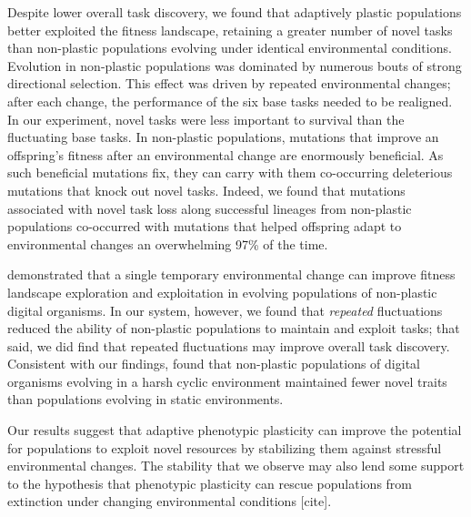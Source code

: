 Despite lower overall task discovery, we found that adaptively plastic populations better exploited the fitness landscape, retaining a greater number of novel tasks than non-plastic populations evolving under identical environmental conditions.
Evolution in non-plastic populations was dominated by numerous bouts of strong directional selection.  
This effect was driven by repeated environmental changes; after each change, the performance of the six base tasks needed to be realigned. 
In our experiment, novel tasks were less important to survival than the fluctuating base tasks.
In non-plastic populations, mutations that improve an offspring's fitness after an environmental change are enormously beneficial. 
As such beneficial mutations fix, they can carry with them co-occurring deleterious mutations that knock out novel tasks. %
Indeed, we found that mutations associated with novel task loss along successful lineages from non-plastic populations co-occurred with mutations that helped offspring adapt to environmental changes an overwhelming 97\% of the time.

\cite{nahum_improved_2017} demonstrated that a single temporary environmental change can improve fitness landscape exploration and exploitation in evolving populations of non-plastic digital organisms.
In our system, however, we found that \textit{repeated} fluctuations reduced the ability of non-plastic populations to maintain and exploit tasks; that said, we did find that repeated fluctuations may improve overall task discovery. 
Consistent with our findings, \cite{canino-koning_fluctuating_2019} found that non-plastic populations of digital organisms evolving in a harsh cyclic environment maintained fewer novel traits than populations evolving in static environments.

Our results suggest that adaptive phenotypic plasticity can improve the potential for populations to exploit novel resources by stabilizing them against stressful environmental changes.
The stability that we observe may also lend some support to the hypothesis that phenotypic plasticity can rescue populations from extinction under changing environmental conditions [cite].

